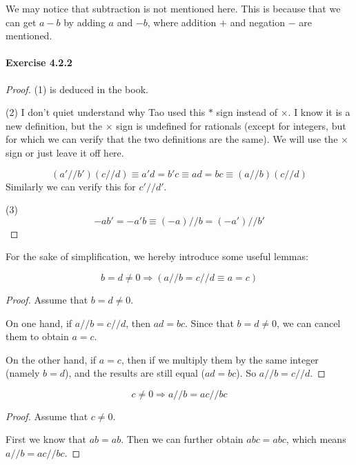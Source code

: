 We may notice that subtraction is not mentioned here. This is because that we can get $a-b$ by adding $a$ 
and $-b$, where addition $+$ and negation $-$ are mentioned.

\paragraph{Exercise 4.2.2} \label{exercise4.2.2}
\begin{proof}
(1) is deduced in the book.

(2)
I don't quiet understand why Tao used this $*$ sign instead of $\times$. I know it is a new definition, 
but the $\times$ sign is undefined for rationals (except for integers, but for which we can verify that 
the two definitions are the same). We will use the $\times $ sign or just leave it off here.

\[
(a'//b')(c//d) \equiv a'd = b'c \equiv ad=bc \equiv (a//b)(c//d)
\]
Similarly we can verify this for $c'//d'$.

(3)
\[
-ab'=-a'b \equiv (-a)//b = (-a')//b'
\]
\end{proof}

For the sake of simplification, we hereby introduce some useful lemmas:
\begin{lem} \label{lem4.2.1}
\[
b=d\neq 0 \Longrightarrow (a//b = c//d \equiv a=c)
\]
\end{lem}
\begin{proof}
Assume that $b=d\neq 0$.

On one hand, if $a//b=c//d$, then $ad=bc$. Since that $b=d \neq 0$, we can cancel them to obtain $a=c$.

On the other hand, if $a=c$, then if we multiply them by the same integer (namely $b=d$), and the 
results are still equal ($ad=bc$). So $a//b=c//d$.
\end{proof}
\begin{lem} \label{lem4.2.2}
\[
c \neq 0 \Longrightarrow a//b=ac//bc
\]
\end{lem}
\begin{proof}
Assume that $c\neq 0$.

First we know that $ab=ab$. Then we can further obtain $abc=abc$, which 
means $a//b=ac//bc$.
\end{proof}

